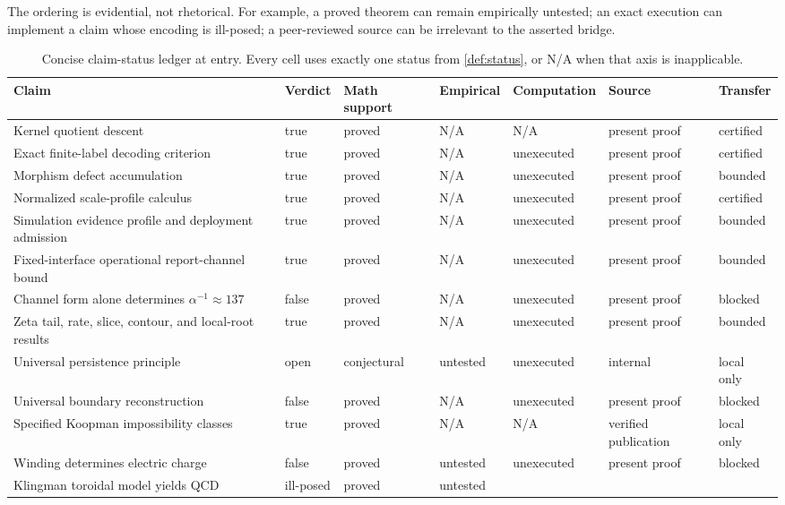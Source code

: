 \documentclass[11pt,a4paper]{article}
\theoremstyle{definition}
\theoremstyle{plain}
\theoremstyle{remark}
\begin{document}
The ordering is evidential, not rhetorical.  For example, a proved theorem can
remain empirically untested; an exact execution can implement a claim whose
encoding is ill-posed; a peer-reviewed source can be irrelevant to the
asserted bridge.

\begin{table}[htbp]
\centering
\scriptsize
\caption{Concise claim-status ledger at entry.  Every cell uses exactly one
status from \cref{def:status}, or N/A when that axis is inapplicable.}
\label{tab:frontledger}
\begin{tabularx}{\textwidth}{L{0.20\textwidth}L{0.085\textwidth}L{0.09\textwidth}L{0.10\textwidth}L{0.11\textwidth}L{0.13\textwidth}Y}
\toprule
Claim & Verdict & Math support & Empirical & Computation & Source & Transfer\\
\midrule
Kernel quotient descent & true & proved & N/A & N/A & present proof & certified\\
Exact finite-label decoding criterion & true & proved & N/A & unexecuted &
present proof & certified\\
Morphism defect accumulation & true & proved & N/A & unexecuted & present proof &
bounded\\
Normalized scale-profile calculus & true & proved & N/A & unexecuted &
present proof & certified\\
Simulation evidence profile and deployment admission & true & proved & N/A &
unexecuted & present proof & bounded\\
Fixed-interface operational report-channel bound & true & proved & N/A &
unexecuted & present proof & bounded\\
Channel form alone determines \(\alpha^{-1}\approx137\) & false & proved &
N/A & unexecuted & present proof & blocked\\
Zeta tail, rate, slice, contour, and local-root results & true & proved & N/A &
unexecuted & present proof & bounded\\
Universal persistence principle & open & conjectural & untested & unexecuted &
internal & local only\\
Universal boundary reconstruction & false & proved & N/A & unexecuted &
present proof & blocked\\
Specified Koopman impossibility classes & true & proved & N/A & N/A &
verified publication & local only\\
Winding determines electric charge & false & proved & untested & unexecuted &
present proof & blocked\\
Klingman toroidal model yields QCD & ill-posed & proved & untested &

\end{tabularx}
\end{table}
\end{document}
